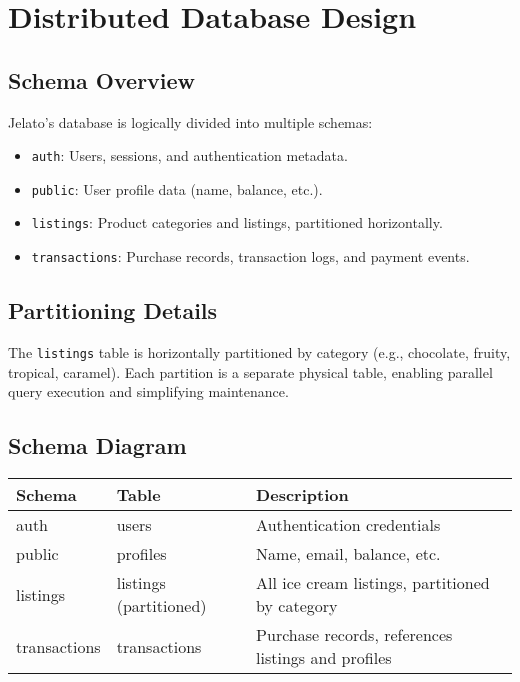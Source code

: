 \documentclass[12pt,a4paper]{report}
\begin{document}
\chapter{Distributed Database Design}
\section{Schema Overview}
Jelato's database is logically divided into multiple schemas:
\begin{itemize}
    \item \texttt{auth}: Users, sessions, and authentication metadata.
    \item \texttt{public}: User profile data (name, balance, etc.).
    \item \texttt{listings}: Product categories and listings, partitioned horizontally.
    \item \texttt{transactions}: Purchase records, transaction logs, and payment events.
\end{itemize}

\section{Partitioning Details}
The \texttt{listings} table is horizontally partitioned by category (e.g., chocolate, fruity, tropical, caramel). Each partition is a separate physical table, enabling parallel query execution and simplifying maintenance.

\section{Schema Diagram}
\begin{center}
\begin{tabular}{|l|l|l|}
\hline
\textbf{Schema} & \textbf{Table} & \textbf{Description} \\
\hline
auth & users & Authentication credentials \\
public & profiles & Name, email, balance, etc. \\
listings & listings (partitioned) & All ice cream listings, partitioned by category \\
transactions & transactions & Purchase records, references listings and profiles \\
\hline
\end{tabular}
\end{center}
\end{document}
